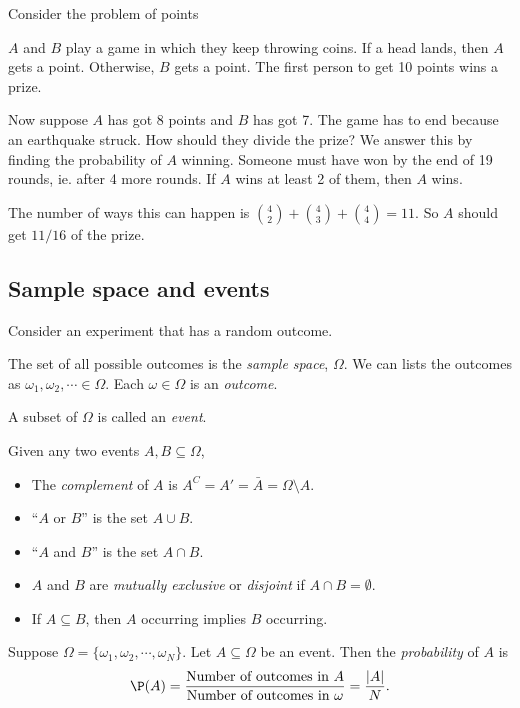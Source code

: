 \documentclass[a4paper]{article}
\begin{document}
Consider the problem of points

$A$ and $B$ play a game in which they keep throwing coins. If a head lands, then $A$ gets a point. Otherwise, $B$ gets a point. The first person to get 10 points wins a prize.

Now suppose $A$ has got 8 points and $B$ has got 7. The game has to end because an earthquake struck. How should they divide the prize? We answer this by finding the probability of $A$ winning. Someone must have won by the end of 19 rounds, ie. after 4 more rounds. If $A$ wins at least 2 of them, then $A$ wins.

The number of ways this can happen is $\binom{4}{2} + \binom{4}{3} + \binom{4}{4} = 11$. So $A$ should get $11/16$ of the prize.

\subsection{Sample space and events}
Consider an experiment that has a random outcome.

\begin{defi}
  The set of all possible outcomes is the \emph{sample space}, $\Omega$. We can lists the outcomes as $\omega_1, \omega_2, \cdots \in \Omega$. Each $\omega \in \Omega$ is an \emph{outcome}.
\end{defi}

\begin{defi}[Event]
  A subset of $\Omega$ is called an \emph{event}.
\end{defi}

\begin{defi}
  Given any two events $A, B\subseteq \Omega$,
  \begin{itemize}
    \item The \emph{complement} of $A$ is $A^C = A' = \bar A = \Omega\setminus A$.
    \item ``$A$ or $B$'' is the set $A\cup B$.
    \item ``$A$ and $B$''  is the set $A\cap B$.
    \item $A$ and $B$ are \emph{mutually exclusive} or \emph{disjoint} if $A\cap B = \emptyset$.
    \item If $A\subseteq B$, then $A$ occurring implies $B$ occurring.
  \end{itemize}
\end{defi}

\begin{defi}[Probability]
  Suppose $\Omega = \{\omega_1,\omega_2, \cdots, \omega_N\}$. Let $A\subseteq \Omega$ be an event. Then the \emph{probability} of $A$ is
  \[
    \P(A) = \frac{\text{Number of outcomes in } A}{\text{Number of outcomes in }\omega} = \frac{|A|}{N}.
  \]
\end{defi}
\end{document}
